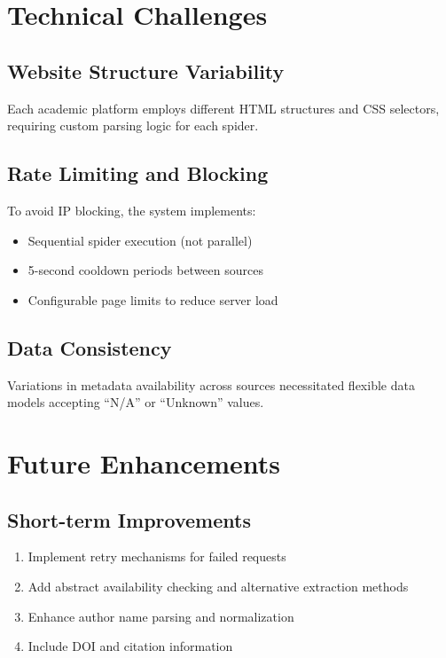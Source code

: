 \documentclass[12pt,a4paper]{article}
\begin{document}
\section{Technical Challenges}

\subsection{Website Structure Variability}
Each academic platform employs different HTML structures and CSS selectors, requiring custom parsing logic for each spider.

\subsection{Rate Limiting and Blocking}
To avoid IP blocking, the system implements:
\begin{itemize}
    \item Sequential spider execution (not parallel)
    \item 5-second cooldown periods between sources
    \item Configurable page limits to reduce server load
\end{itemize}

\subsection{Data Consistency}
Variations in metadata availability across sources necessitated flexible data models accepting ``N/A'' or ``Unknown'' values.

\section{Future Enhancements}

\subsection{Short-term Improvements}
\begin{enumerate}
    \item Implement retry mechanisms for failed requests
    \item Add abstract availability checking and alternative extraction methods
    \item Enhance author name parsing and normalization
    \item Include DOI and citation information
\end{enumerate}
\end{document}
